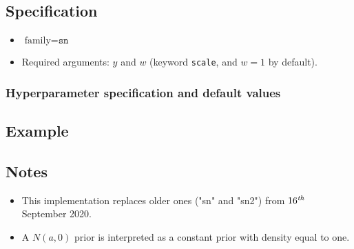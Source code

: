 \documentclass[a4paper,11pt]{article}
\begin{document}
\subsection*{Specification}

\begin{itemize}
\item $\text{family}=\texttt{sn}$
\item Required arguments: $y$ and $w$ (keyword \texttt{scale}, and 
    $w=1$ by default).
\end{itemize}

\subsubsection*{Hyperparameter specification and default values}



\subsection*{Example}



\subsection*{Notes}

\begin{itemize}
\item This implementation replaces older ones ("sn" and "sn2") from
    $16^{\text{\emph{th}}}$ September 2020.
\item A $N(a,0)$ prior is interpreted as a constant prior with density
    equal to one.
\end{itemize}
\end{document}
